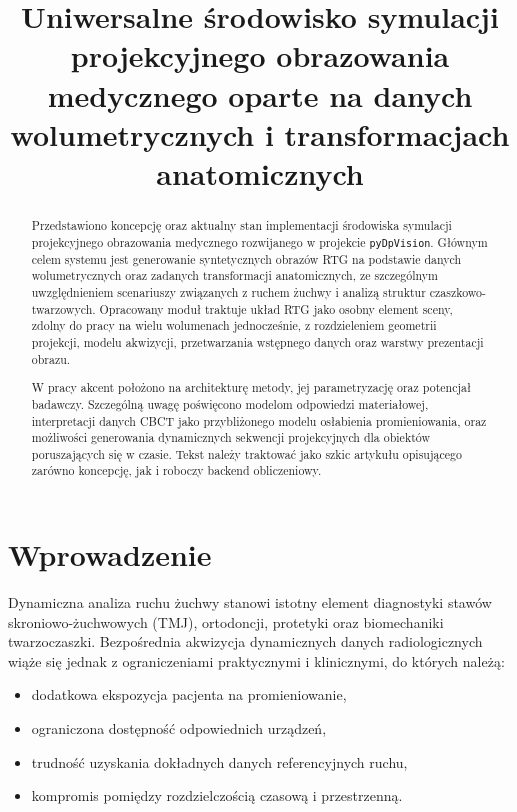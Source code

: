 \documentclass[11pt,a4paper]{article}
\title{Uniwersalne środowisko symulacji projekcyjnego obrazowania medycznego oparte na danych wolumetrycznych i transformacjach anatomicznych}
\date{}
\begin{document}
\maketitle

\begin{abstract}

Przedstawiono koncepcję oraz aktualny stan implementacji środowiska symulacji
projekcyjnego obrazowania medycznego rozwijanego w projekcie \texttt{pyDpVision}.
Głównym celem systemu jest generowanie syntetycznych obrazów RTG na podstawie
danych wolumetrycznych oraz zadanych transformacji anatomicznych, ze szczególnym
uwzględnieniem scenariuszy związanych z ruchem żuchwy i analizą struktur
czaszkowo-twarzowych. Opracowany moduł traktuje układ RTG jako osobny element sceny,
zdolny do pracy na wielu wolumenach jednocześnie, z rozdzieleniem geometrii projekcji,
modelu akwizycji, przetwarzania wstępnego danych oraz warstwy prezentacji obrazu.

W pracy akcent położono na architekturę metody, jej parametryzację oraz potencjał
badawczy. Szczególną uwagę poświęcono modelom odpowiedzi materiałowej,
interpretacji danych CBCT jako przybliżonego modelu osłabienia promieniowania,
oraz możliwości generowania dynamicznych sekwencji projekcyjnych dla obiektów
poruszających się w czasie. Tekst należy traktować jako szkic artykułu opisującego
zarówno koncepcję, jak i roboczy backend obliczeniowy.

\end{abstract}

\section{Wprowadzenie}

Dynamiczna analiza ruchu żuchwy stanowi istotny element diagnostyki stawów
skroniowo-żuchwowych (TMJ), ortodoncji, protetyki oraz biomechaniki twarzoczaszki.
Bezpośrednia akwizycja dynamicznych danych radiologicznych wiąże się jednak
z ograniczeniami praktycznymi i klinicznymi, do których należą:
\begin{itemize}
\item dodatkowa ekspozycja pacjenta na promieniowanie,
\item ograniczona dostępność odpowiednich urządzeń,
\item trudność uzyskania dokładnych danych referencyjnych ruchu,
\item kompromis pomiędzy rozdzielczością czasową i przestrzenną.
\end{itemize}
\end{document}
